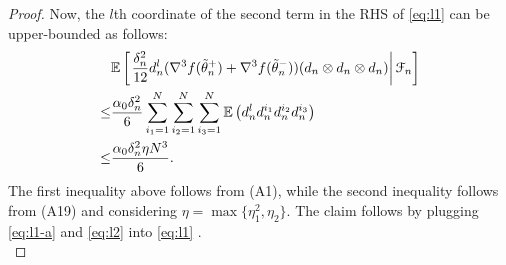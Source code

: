 \begin{proof}
Now, the $l$th coordinate of the second term in the RHS of \eqref{eq:l1} can be upper-bounded as follows:
\begin{align}
&\mathbb{E}\left[\left.\frac{\delta_n^2}{12} d_n^l (\nabla^3 f(\tilde  \theta_n^+)+\nabla^3 f(\tilde  \theta_n^-))(d_n \otimes d_n \otimes d_n)\right| \mathcal{F}_n\right]\nonumber\\
\le & \dfrac{\alpha_0 \delta_n^2}{6} \sum_{i_1=1}^N\sum_{i_2=1}^N\sum_{i_3=1}^N \mathbb{E}\left( d_n^l d_n^{i_1} d_n^{i_2} d_n^{i_3}\right)\nonumber\\
\le & \dfrac{\alpha_0 \delta_n^2\eta N^3}{6}.\label{eq:l2}
\end{align}
The first inequality above follows from (A1), while the second inequality follows from (A19) and considering $\eta = \max \{\eta_1^2, \eta_2\}$. The claim follows by plugging \eqref{eq:l1-a} and \eqref{eq:l2} into \eqref{eq:l1} .\\
\end{proof}
%
%

